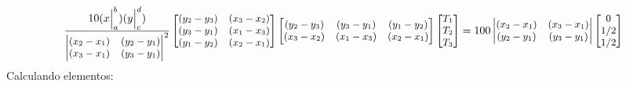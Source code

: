 \documentclass[10pt]{article}
\begin{document}
\begin{align*}\small{
\frac{10(x\Big|_a^b)(y\Big|_c^d)}{\begin{vmatrix}
(x_2-x_1) & (y_2-y_1) \\
(x_3-x_1) & (y_3-y_1)
\end{vmatrix}^2} \begin{bmatrix}
(y_2 - y_3) & (x_3 - x_2)\\
 (y_3-y_1) & (x_1-x_3) \\
 (y_1-y_2) & (x_2-x_1)
\end{bmatrix} \begin{bmatrix}
(y_2 - y_3) & (y_3-y_1) & (y_1-y_2) \\
(x_3 - x_2) & (x_1-x_3) & (x_2-x_1)
\end{bmatrix} \begin{bmatrix}
T_1 \\ T_2 \\ T_3
\end{bmatrix} = 100 \begin{vmatrix} (x_2-x_1) & (x_3-x_1) \\ 
(y_2-y_1) & (y_3-y_1) \end{vmatrix} \begin{bmatrix} 
0 \\ 1/2 \\ 1/2
\end{bmatrix}}
\end{align*}
\newpage
Calculando elementos: \\
\end{document}
